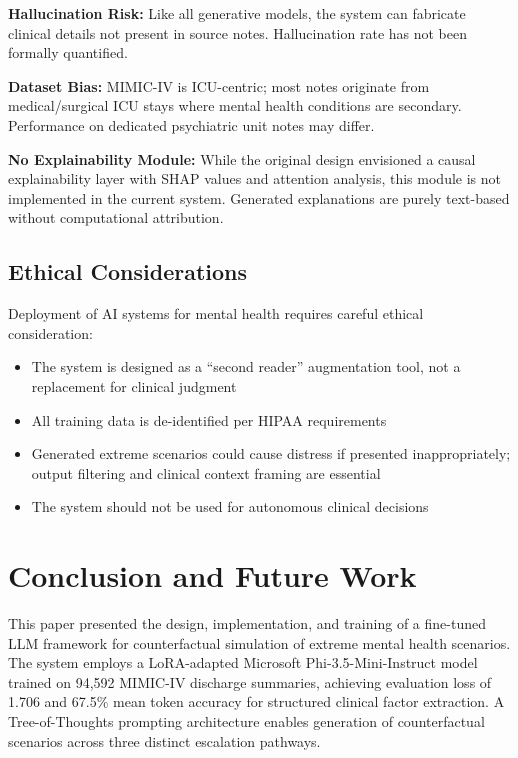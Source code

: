 \documentclass[conference]{IEEEtran}
\begin{document}
\textbf{Hallucination Risk:} Like all generative models, the system can fabricate clinical details not present in source notes. Hallucination rate has not been formally quantified.

\textbf{Dataset Bias:} MIMIC-IV is ICU-centric; most notes originate from medical/surgical ICU stays where mental health conditions are secondary. Performance on dedicated psychiatric unit notes may differ.

\textbf{No Explainability Module:} While the original design envisioned a causal explainability layer with SHAP values and attention analysis, this module is not implemented in the current system. Generated explanations are purely text-based without computational attribution.

\subsection{Ethical Considerations}

Deployment of AI systems for mental health requires careful ethical consideration:

\begin{itemize}
\item The system is designed as a ``second reader'' augmentation tool, not a replacement for clinical judgment
\item All training data is de-identified per HIPAA requirements
\item Generated extreme scenarios could cause distress if presented inappropriately; output filtering and clinical context framing are essential
\item The system should not be used for autonomous clinical decisions
\end{itemize}

\section{Conclusion and Future Work}

This paper presented the design, implementation, and training of a fine-tuned LLM framework for counterfactual simulation of extreme mental health scenarios. The system employs a LoRA-adapted Microsoft Phi-3.5-Mini-Instruct model trained on 94,592 MIMIC-IV discharge summaries, achieving evaluation loss of 1.706 and 67.5\% mean token accuracy for structured clinical factor extraction. A Tree-of-Thoughts prompting architecture enables generation of counterfactual scenarios across three distinct escalation pathways.
\end{document}
